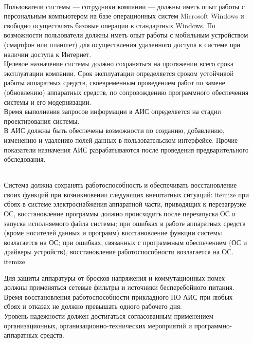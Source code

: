 \documentclass[russian, utf8, 12pt,pointsubsection,floatsubsection]{eskdtext}
\begin{document}
\\ 
Пользователи системы --- сотрудники компании --- должны иметь опыт работы с персональным компьютером на базе операционных систем Microsoft Windows и свободно осуществлять базовые операции в стандартных Windows. По возможности пользователи должны иметь опыт работы с мобильным устройством (смартфон или планшет) для осуществления удаленного доступа к системе при наличии доступа к Интернет.
\\
Целевое назначение системы должно сохраняться на протяжении всего срока эксплуатации компании. Срок эксплуатации определяется сроком устойчивой работы аппаратных средств, своевременным проведением работ по замене (обновлению) аппаратных средств, по сопровождению программного обеспечения системы и его модернизации.\\
Время выполнения запросов информации в АИС определяется на стадии проектирования системы.\\
В АИС должны быть обеспечены возможности по созданию, добавлению, изменению и удалению полей данных в пользовательском интерфейсе.
Прочие показатели назначения АИС разрабатываются после проведения предварительного обследования.

\\ 
Система должна сохранять работоспособность и обеспечивать восстановление своих функций при возникновении следующих внештатных ситуаций:
itemize
при сбоях в системе электроснабжения аппаратной части, приводящих к перезагрузке ОС, восстановление программы должно происходить после перезапуска ОС и запуска исполняемого файла системы;
при ошибках в работе аппаратных средств (кроме носителей данных и программ) восстановление функции системы возлагается на ОС;
при ошибках, связанных с программным обеспечением (ОС и драйверы устройств), восстановление работоспособности возлагается на ОС.
itemize

Для защиты аппаратуры от бросков напряжения и коммутационных помех должны применяться сетевые фильтры и источники бесперебойного питания.\\
Время восстановления работоспособности прикладного ПО АИС при любых сбоях и отказах не должно превышать одного рабочего дня.\\
Уровень надежности должен достигаться согласованным применением организационных, организационно-технических мероприятий и программно-аппаратных средств.\\
\end{document}
